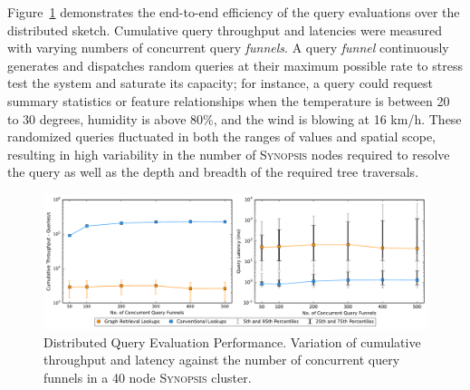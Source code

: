 Figure~\ref{fig:dist-query} demonstrates the end-to-end efficiency of the query evaluations over the distributed sketch.
Cumulative query throughput and latencies were measured with varying numbers of concurrent query \emph{funnels}.
A query \emph{funnel} continuously generates and dispatches random queries at their maximum possible rate to stress test the system and saturate its capacity; for instance, a query could request summary statistics or feature relationships when the temperature is between 20 to 30 degrees, humidity is above 80\%, and the wind is blowing at 16 km/h.
These randomized queries fluctuated in both the ranges of values and spatial scope, resulting in high variability in the number of \textsc{Synopsis} nodes required to resolve the query as well as the depth and breadth of the required tree traversals.

\begin{figure}
    \centerline{\includegraphics[width=\linewidth]{figures/query_benchmark_both.pdf}}
    \caption{Distributed Query Evaluation Performance. Variation of cumulative throughput and latency against the number of concurrent query funnels in a 40 node \textsc{Synopsis} cluster.}
    \label{fig:dist-query}
\end{figure}




